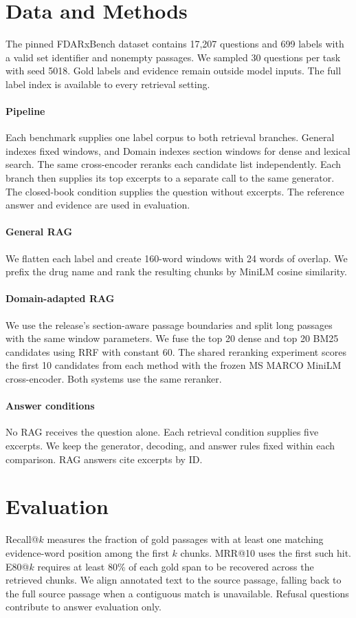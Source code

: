 \documentclass[11pt]{article}
\begin{document}
\section{Data and Methods}
The pinned FDARxBench dataset contains 17,207 questions and 699 labels with a valid set identifier and nonempty passages. We sampled 30 questions per task with seed 5018. Gold labels and evidence remain outside model inputs. The full label index is available to every retrieval setting.
\paragraph{Pipeline}
Each benchmark supplies one label corpus to both retrieval branches. General indexes fixed windows, and Domain indexes section windows for dense and lexical search. The same cross-encoder reranks each candidate list independently. Each branch then supplies its top excerpts to a separate call to the same generator. The closed-book condition supplies the question without excerpts. The reference answer and evidence are used in evaluation.

\paragraph{General RAG} We flatten each label and create 160-word windows with 24 words of overlap. We prefix the drug name and rank the resulting chunks by MiniLM cosine similarity.
\paragraph{Domain-adapted RAG} We use the release's section-aware passage boundaries and split long passages with the same window parameters. We fuse the top 20 dense and top 20 BM25 candidates using RRF with constant 60. The shared reranking experiment scores the first 10 candidates from each method with the frozen MS MARCO MiniLM cross-encoder. Both systems use the same reranker.
\paragraph{Answer conditions} No RAG receives the question alone. Each retrieval condition supplies five excerpts. We keep the generator, decoding, and answer rules fixed within each comparison. RAG answers cite excerpts by ID.
\section{Evaluation}
Recall@\(k\) measures the fraction of gold passages with at least one matching evidence-word position among the first \(k\) chunks. MRR@10 uses the first such hit. E80@\(k\) requires at least 80\% of each gold span to be recovered across the retrieved chunks. We align annotated text to the source passage, falling back to the full source passage when a contiguous match is unavailable. Refusal questions contribute to answer evaluation only.
\end{document}
